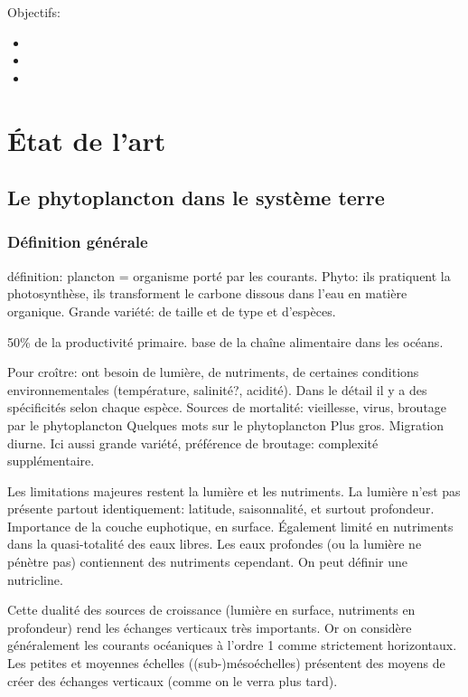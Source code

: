 Objectifs:
\begin{itemize}
  \item
  \item
  \item
\end{itemize}


\section{État de l'art}
\label{sec:etat-de-lart}

\subsection{Le phytoplancton dans le système terre}
\label{sec:phyto-ds-sys-terre}

\subsubsection{Définition générale}
\label{sec:phyto-def-gen}

définition: plancton = organisme porté par les courants.
Phyto: ils pratiquent la photosynthèse, ils transforment le carbone dissous dans l'eau en matière organique.
Grande variété: de taille et de type et d'espèces.

50\% de la productivité primaire.
base de la chaîne alimentaire dans les océans.

Pour croître: ont besoin de lumière, de nutriments, de certaines conditions environnementales (température, salinité?, acidité). Dans le détail il y a des spécificités selon chaque espèce.
Sources de mortalité: vieillesse, virus, broutage par le phytoplancton
Quelques mots sur le phytoplancton Plus gros. Migration diurne. Ici aussi grande variété, préférence de broutage: complexité supplémentaire.

Les limitations majeures restent la lumière et les nutriments.
La lumière n'est pas présente partout identiquement: latitude, saisonnalité, et surtout profondeur. Importance de la couche euphotique, en surface.
Également limité en nutriments dans la quasi-totalité des eaux libres. Les eaux profondes (ou la lumière ne pénètre pas) contiennent des nutriments cependant. On peut définir une nutricline.

Cette dualité des sources de croissance (lumière en surface, nutriments en profondeur) rend les échanges verticaux très importants.
Or on considère généralement les courants océaniques à l'ordre 1 comme strictement horizontaux.
Les petites et moyennes échelles ((sub-)mésoéchelles) présentent des moyens de créer des échanges verticaux (comme on le verra plus tard).

